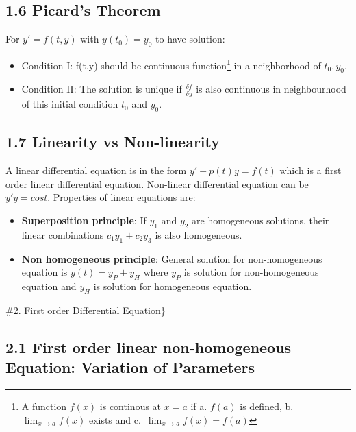 \documentclass[
  11pt,
]{article}
\providecommand{\tightlist}{%
  \setlength{\itemsep}{0pt}\setlength{\parskip}{0pt}}
\begin{document}
\subsection{1.6 Picard's Theorem}\label{picards-theorem}

For \(y' = f(t,y)\) with \(y(t_0)=y_0\) to have solution:

\begin{itemize}
\tightlist
\item
  Condition I: f(t,y) should be continuous function\footnote{A function
    \(f(x)\) is continous at \(x=a\) if a. \(f(a)\) is defined, b.
    \(\lim_{x \to a} f(x)\) exists and c.~\(\lim_{x \to a} f(x) = f(a)\)}
  in a neighborhood of \(t_0,y_0\).
\item
  Condition II: The solution is unique if \(\frac{\delta f}{\delta y}\)
  is also continuous in neighbourhood of this initial condition \(t_0\)
  and \(y_0\).\\
\end{itemize}

\subsection{1.7 Linearity vs
Non-linearity}\label{linearity-vs-non-linearity}

A linear differential equation is in the form \(y'+p(t)y=f(t)\) which is
a first order linear differential equation. Non-linear differential
equation can be \(y'y=cost\). Properties of linear equations are:

\begin{itemize}
\tightlist
\item
  \textbf{Superposition principle}: If \(y_1\) and \(y_2\) are
  homogeneous solutions, their linear combinations \(c_1y_1 + c_2y_3\)
  is also homogeneous.
\item
  \textbf{Non homogeneous principle}: General solution for
  non-homogeneous equation is \(y(t) = y_P + y_H\) where \(y_P\) is
  solution for non-homogeneous equation and \(y_H\) is solution for
  homogeneous equation.
\end{itemize}

\newpage

\#2. First order Differential Equation\}

\subsection{2.1 First order linear non-homogeneous Equation: Variation
of
Parameters}\label{first-order-linear-non-homogeneous-equation-variation-of-parameters}
\end{document}
